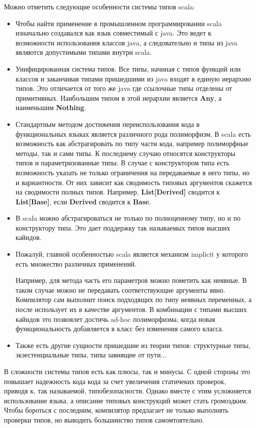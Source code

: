 Можно отметить следующие особенности системы типов scala:
\begin{itemize}
  \item Чтобы найти применение в промышленном программировании scala изначально
  создавался как язык совместимый с java.
  Это ведет к возможности использования классов java, а следовательно и типы
  из java являются допустимыми типами внутри scala.
  \item Унифицированная система типов. Все типы, начиная с типов функций или
  классов и заканчивая типами пришедшими из java входят в единую иерархию типов.
  Это отличается от того же java где ссылочные типы отделены от примитивных.
  Наибольшим типом в этой иерархии является \textbf{Any}, а наименьшим
  \textbf{Nothing}.
  \item Стандартным методом достижения переиспользования кода
  в функциональных языках является различного рода полиморфизм.
  В scala есть возможность как абстрагировать по типу части кода,
  например полиморфные методы, так и сами типы.
  К последнему случаю относятся конструкторы типов и параметризованные типы.
  В случае с конструктором типа есть возможность указать не только ограничения
  на передаваемые в него типы, но и вариантности.
  От них зависит как сводимость типовых аргументов скажется на
  сводимости полных типов.
  Например, \textbf{List[Derived]} сводится к \textbf{List[Base]}, если
  \textbf{Derived} сводится к \textbf{Base}.
  \item В scala можно абстрагироваться не только по полноценному типу,
  но и по конструктору типа.
  Это дает поддержку так называемых типов высших кайндов.
  \item Пожалуй, главной особенностью scala является механизм implicit у которого
  есть множество различных применений.

  Например, для метода часть его параметров можно пометить как неявные.
  В таком случае можно не передавать соответствующие аргументы явно.
  Компилятор сам выполнит поиск подходящих по типу неявных переменных,
  а после использует их в качестве аргументов.
  В комбинации с типами высших кайндов это позвоялет достичь ad-hoc полиморфизма,
  когда новая функциональность добавляется в класс без изменения самого
  класса.
  \item Также есть другие сущности пришедшие из теории типов:
  структурные типы, экзестенциальные типы, типы завиящие от пути...
\end{itemize}

В сложности системы типов есть как плюсы, так и минусы.
С одной стороны это повышает надежность кода кода за счет увеличения статичеких
проверок, приводя к, так называемой, типобезопасности.
Однако вместе с этим усложняется использование языка, а описание типовых
конструкций может стать громоздким.
Чтобы бороться с последним, компилятор предлагает не только выполнять проверки
типов, но выводить большинство типов самомтоятельно.

